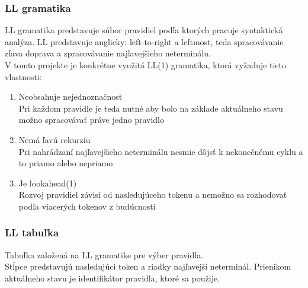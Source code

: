 \documentclass[a4paper]{article}
\begin{document}
\subsubsection{LL gramatika}
LL gramatika predstavuje súbor pravidiel podľa ktorých pracuje syntaktická analýza. LL predstavuje anglicky: left-to-right a leftmost, teda spracovávanie zľava doprava a zpracovávanie najľavejšieho neterminálu.\\
V tomto projekte je konkrétne využitá LL(1) gramatika, ktorá vyžaduje tieto vlastnosti:
\begin{enumerate}
\item{Neobsahuje nejednoznačnosť\\
Pri každom pravidle je teda nutné aby bolo na základe aktuálneho stavu možno spracovávať práve jedno pravidlo}
\item{Nemá ľavú rekurziu\\
Pri nahrádzaní najľavejšieho neterminálu nesmie dôjsť k nekonečnému cyklu a to priamo alebo nepriamo}
\item{Je lookahead(1)\\
Rozvoj pravidiel závisí od nasledujúceho tokenu a nemožno sa rozhodovať podľa viacerých tokenov z budúcnosti}
\end{enumerate}

\subsubsection{LL tabuľka}
Tabuľka založená na LL gramatike pre výber pravidla.\\
Stĺpce predstavujú nasledujúci token a riadky najľavejší neterminál. Prienikom aktuálneho stavu je identifikátor pravidla, ktoré sa použije.
\end{document}
